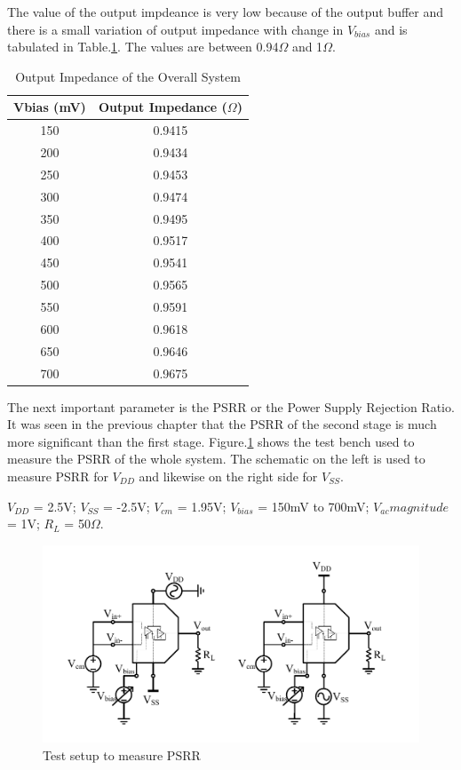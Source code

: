 The value of the output impdeance is very low because of the output buffer and there is a small variation of output impedance with change in $V_{bias}$ and is tabulated in Table.\ref{tab:ZOUT}. The values are between 0.94$\Omega$ and 1$\Omega$.
\begin{table} [H]
\centering
\begin{tabular}{@{}cc@{}}
\toprule
Vbias (mV)			& Output Impedance ($\Omega$)	\\ \midrule
150					& 0.9415 \\
200					& 0.9434 \\
250					& 0.9453 \\
300					& 0.9474 \\
350					& 0.9495 \\
400					& 0.9517 \\
450					& 0.9541 \\
500					& 0.9565 \\
550					& 0.9591 \\
600					& 0.9618 \\
650					& 0.9646 \\
700 				& 0.9675 \\
\bottomrule
\end{tabular}
\caption{Output Impedance of the Overall System}
\label{tab:ZOUT}
\end{table}

The next important parameter is the PSRR or the Power Supply Rejection Ratio. It was seen in the previous chapter that the PSRR of the second stage is much more significant than the first stage. Figure.\ref{fig:TB_PSRR} shows the test bench used to measure the PSRR of the whole system. The schematic on the left is used to measure PSRR for $V_{DD}$ and likewise on the right side for $V_{SS}$.

$V_{DD}$ = 2.5V; $V_{SS}$ = -2.5V; $V_{cm}$ = 1.95V; $V_{bias}$ = 150mV to 700mV;  $V_{ac} magnitude$ = 1V; $R_{L}$ = 50$\Omega$.

\begin{figure} [H]
\centering
\includegraphics[scale=1]{Figures/Test_Benches/Overall/PSRR.pdf}
\caption{Test setup to measure PSRR}
\label{fig:TB_PSRR}
\end{figure}

